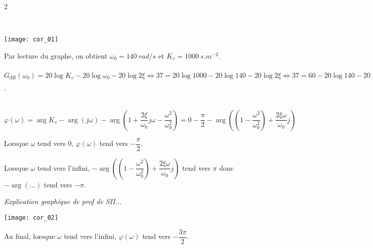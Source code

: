 \begin{multicols}{2}
\ifprof \begin{corrige}~\\

\begin{minipage}[c]{.45\linewidth}
\begin{center}
\texttt{[image: cor\_01]}
\end{center}
\end{minipage} \hfill
\begin{minipage}[c]{.45\linewidth}
Par lecture du graphe, on obtient $\omega_0=\SI{140}{rad/s}$ et $K_v=\SI{1000}{s.m^{-2}}$.

$G_{\text{dB}}\left(\omega_0 \right)=
20\log K_v- 20\log  \omega_0 - 20\log 2\xi 
\Leftrightarrow 37=20\log 1000 - 20\log  140 - 20\log 2\xi
\Leftrightarrow 37=60 - 20\log  140 - 20\log 2\xi
\Leftrightarrow \dfrac{37-60 + 20\log  140}{-20} =\log 2\xi
\Leftrightarrow  \xi \simeq 0,05
$.
\end{minipage}
\end{corrige} \else \fi



\ifprof \begin{corrige} ~\\

$
\varphi\left(  \omega\right)
=\arg K_v- \arg \left( j\omega\right) - \arg  \left( 1+\dfrac{2\xi}{\omega_0} j\omega - \dfrac{\omega^2}{\omega_0^2}  \right)
=0-\dfrac{\pi}{2} - \arg  \left( \left( 1 - \dfrac{\omega^2}{\omega_0^2}\right) + \dfrac{2\xi\omega}{\omega_0} j \right)
$

Lorsque $\omega$ tend vers 0, $\varphi\left(\omega\right)$ 
tend vers $-\dfrac{\pi}{2}$. 

Lorsque $\omega$ tend vers l'infini,
$-\arg  \left( \left( 1 - \dfrac{\omega^2}{\omega_0^2}\right) + \dfrac{2\xi\omega}{\omega_0} j \right)$ tend vers $\pi$ donc $-\arg(...)$ tend vers $-\pi$.

\textit{Explication graphique de prof de SII...}
\begin{center}
\texttt{[image: cor\_02]}
\end{center}
Au final, lorsque $\omega$ tend vers l'infini, $\varphi(\omega)$ tend vers $-\dfrac{3\pi}{2}$.


\end{corrige}
\end{multicols}
